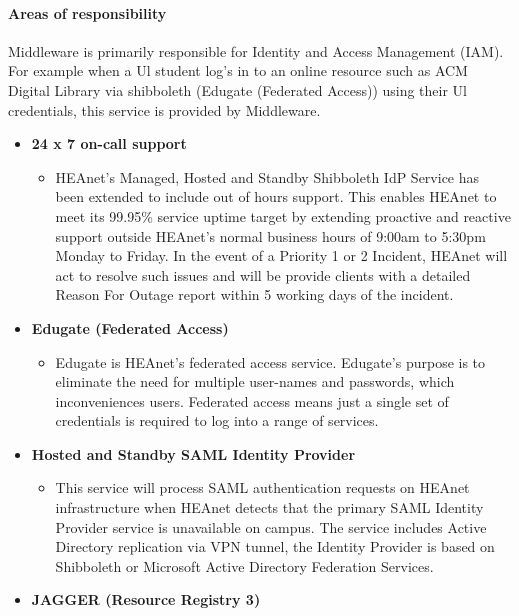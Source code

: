 \documentclass{article}
\begin{document}
\paragraph{Areas of responsibility \newline}
Middleware is primarily responsible for Identity and Access Management (IAM). For example when a Ul student log's in to an online resource such as ACM Digital Library via shibboleth (Edugate (Federated Access)) using their Ul credentials, this service is provided by Middleware.
\begin{itemize}
	\item \textbf{24 x 7  on-call support}
	      \begin{itemize}
	      	\item HEAnet's Managed, Hosted and Standby Shibboleth IdP Service has been extended to include out of hours support. This enables HEAnet to meet its 99.95\% service uptime target by extending proactive and reactive support outside HEAnet's normal business hours of 9:00am to 5:30pm Monday to Friday. In the event of a Priority 1 or 2 Incident, HEAnet will act to resolve such issues and will be provide clients with a detailed Reason For Outage report within 5 working days of the incident.
	      \end{itemize}
	\item \textbf{Edugate (Federated Access)}
	      \begin{itemize}
	      	\item Edugate is HEAnet's federated access service. Edugate's purpose is to eliminate the need for multiple user-names and passwords, which inconveniences users. Federated access means just a single set of credentials is required to log into a range of services.
	      \end{itemize}
	\item \textbf{Hosted and Standby SAML Identity Provider}
	      \begin{itemize}
	      	\item This service will process SAML authentication requests on HEAnet infrastructure when HEAnet detects that the primary SAML Identity Provider service is unavailable on campus. The service includes Active Directory replication via VPN tunnel, the Identity Provider is based on Shibboleth or Microsoft Active Directory Federation Services.
	      \end{itemize}
	\item \textbf{JAGGER (Resource Registry 3)}
	      \begin{itemize}

\end{itemize}
\end{itemize}
\end{document}
